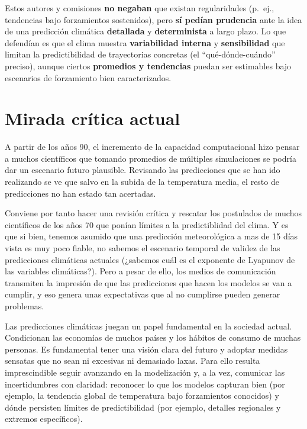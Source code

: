 \documentclass[
  10pt,
  a4paper,
  DIV=11,
  numbers=noendperiod,
  open=any]{scrreprt}
\numberwithin{equation}{chapter}
\numberwithin{equation}{chapter}
\renewcommand{\[}{\begin{equation}}
\renewcommand{\]}{\end{equation}}
\begin{document}
Estos autores y comisiones \textbf{no negaban} que existan regularidades
(p.~ej., tendencias bajo forzamientos sostenidos), pero \textbf{sí
pedían prudencia} ante la idea de una predicción climática
\textbf{detallada} y \textbf{determinista} a largo plazo. Lo que
defendían es que el clima muestra \textbf{variabilidad interna} y
\textbf{sensibilidad} que limitan la predictibilidad de trayectorias
concretas (el ``qué-dónde-cuándo'' preciso), aunque ciertos
\textbf{promedios y tendencias} puedan ser estimables bajo escenarios de
forzamiento bien caracterizados.

\section{Mirada crítica actual}\label{mirada-cruxedtica-actual}

A partir de los años 90, el incremento de la capacidad computacional
hizo pensar a muchos científicos que tomando promedios de múltiples
simulaciones se podría dar un escenario futuro plausible. Revisando las
predicciones que se han ido realizando se ve que salvo en la subida de
la temperatura media, el resto de predicciones no han estado tan
acertadas.

Conviene por tanto hacer una revisión crítica y rescatar los postulados
de muchos científicos de los años 70 que ponían límites a la
predictiblidad del clima. Y es que si bien, tenemos asumido que una
predicción meteorológica a mas de 15 días vista es muy poco fiable, no
sabemos el escenario temporal de validez de las predicciones climáticas
actuales (¿sabemos cuál es el exponente de Lyapunov de las variables
climáticas?). Pero a pesar de ello, los medios de comunicación
transmiten la impresión de que las predicciones que hacen los modelos se
van a cumplir, y eso genera unas expectativas que al no cumplirse pueden
generar problemas.

Las predicciones climáticas juegan un papel fundamental en la sociedad
actual. Condicionan las economías de muchos países y los hábitos de
consumo de muchas personas. Es fundamental tener una visión clara del
futuro y adoptar medidas sensatas que no sean ni excesivas ni demasiado
laxas. Para ello resulta imprescindible seguir avanzando en la
modelización y, a la vez, comunicar las incertidumbres con claridad:
reconocer lo que los modelos capturan bien (por ejemplo, la tendencia
global de temperatura bajo forzamientos conocidos) y dónde persisten
límites de predictibilidad (por ejemplo, detalles regionales y extremos
específicos).
\end{document}

